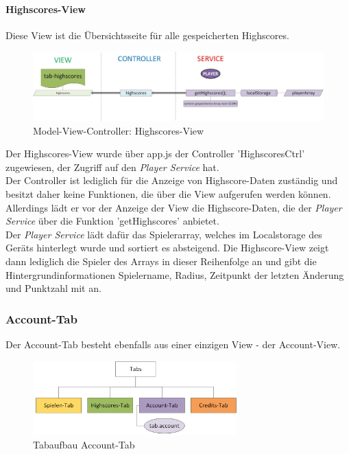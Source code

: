 \paragraph{Highscores-View}
%
%
Diese View ist die Übersichtsseite für alle gespeicherten Highscores.
%
\begin{figure}[h]
\centering
\includegraphics[width=1\textwidth]{ref/images/06-highscores-tab.png}
\caption[Model-View-Controller: Highscores-View]{Model-View-Controller: Highscores-View}
\label{fig:MVC:Highscores-View}
\end{figure}


%
Der Highscores-View wurde über app.js der Controller 'HighscoresCtrl' zugewiesen, der Zugriff auf den \emph{Player Service} hat.
\\
Der Controller ist lediglich für die Anzeige von Highscore-Daten zuständig und besitzt daher keine Funktionen, die über die View aufgerufen werden können. Allerdings lädt er vor der Anzeige der View die Highscore-Daten, die der \emph{Player Service} über die Funktion 'getHighscores' anbietet.
\\
Der \emph{Player Service} lädt dafür das Spielerarray, welches im Localstorage des Geräts hinterlegt wurde und sortiert es absteigend. Die Highscore-View zeigt dann lediglich die Spieler des Arrays in dieser Reihenfolge an und gibt die Hintergrundinformationen Spielername, Radius, Zeitpunkt der letzten Änderung und Punktzahl mit an.
\subsubsection{Account-Tab}
Der Account-Tab besteht ebenfalls aus einer einzigen View - der Account-View.
\begin{figure}[h]
\centering
\includegraphics[width=0.7\textwidth]{ref/images/tabs_account.png}
\caption[Tabaufbau Account-Tab]{Tabaufbau Account-Tab}
\label{fig:Tabaufbau Account-Tab}
\end{figure}

